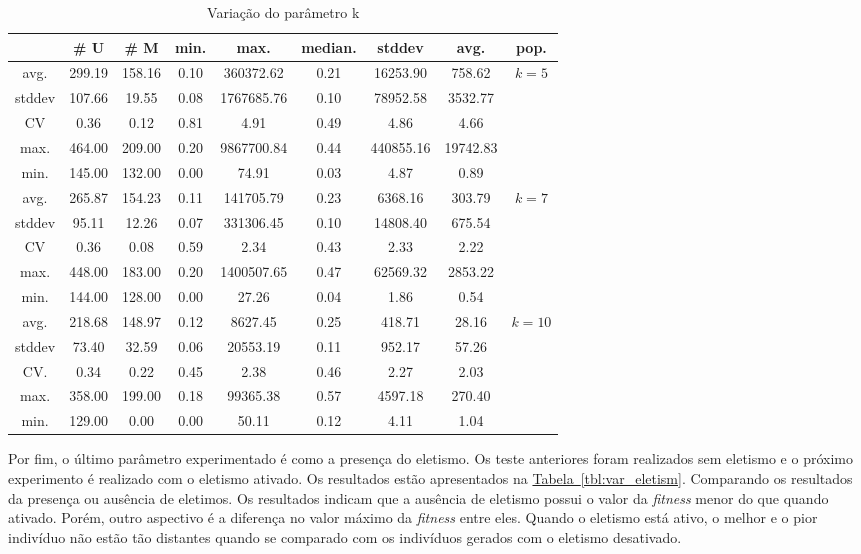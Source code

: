 \documentclass[a4paper]{paper}
\begin{document}
\begin{table}
  \center
  \caption{Variação do parâmetro k}
  \label{tbl:var_k}
  \begin{tabular}{| c | c | c | c | c | c | c | c | c |}
    \hline
    &  \# U & \# M & min. & max. & median. & stddev & avg. & pop. \\ \hline \hline
avg. & 299.19 & 158.16 & 0.10 & 360372.62 & 0.21 & 16253.90 & 758.62 & \multirow{5}{1.5cm}{$k=5$} \\ \cline{1-8}
stddev & 107.66 & 19.55 & 0.08 & 1767685.76 & 0.10 & 78952.58 & 3532.77 & \\ \cline{1-8}
CV & 0.36 & 0.12 & 0.81 & 4.91 & 0.49 & 4.86 & 4.66 & \\ \cline{1-8}
max. & 464.00 & 209.00 & 0.20 & 9867700.84 & 0.44 & 440855.16 & 19742.83 & \\ \cline{1-8}
min. & 145.00 & 132.00 & 0.00 & 74.91 & 0.03 & 4.87 & 0.89 & \\ \hline \hline
avg. & 265.87 & 154.23 & 0.11 & 141705.79 & 0.23 & 6368.16 & 303.79 & \multirow{5}{1.5cm}{$k=7$} \\ \cline{1-8}
stddev & 95.11 & 12.26 & 0.07 & 331306.45 & 0.10 & 14808.40 & 675.54 & \\ \cline{1-8}
CV & 0.36 & 0.08 & 0.59 & 2.34 & 0.43 & 2.33 & 2.22 & \\ \cline{1-8}
max. & 448.00 & 183.00 & 0.20 & 1400507.65 & 0.47 & 62569.32 & 2853.22 & \\ \cline{1-8}
min. & 144.00 & 128.00 & 0.00 & 27.26 & 0.04 & 1.86 & 0.54 & \\ \hline \hline
avg. & 218.68 & 148.97 & 0.12 & 8627.45 & 0.25 & 418.71 & 28.16 & \multirow{5}{1.5cm}{$k=10$}\\ \cline{1-8}
stddev & 73.40 & 32.59 & 0.06 & 20553.19 & 0.11 & 952.17 & 57.26 & \\ \cline{1-8}
CV. & 0.34 & 0.22 & 0.45 & 2.38 & 0.46 & 2.27 & 2.03 & \\ \cline{1-8}
max. & 358.00 & 199.00 & 0.18 & 99365.38 & 0.57 & 4597.18 & 270.40 & \\ \cline{1-8}
min. & 129.00 & 0.00 & 0.00 & 50.11 & 0.12 & 4.11 & 1.04 & \\ \hline 
  \end{tabular}
\end{table}

Por fim, o último parâmetro experimentado é como a presença do eletismo. Os
teste anteriores foram realizados sem eletismo e o próximo experimento é
realizado com o eletismo ativado. Os resultados estão apresentados na
\hyperref[tbl:var_eletism]{Tabela~\ref*{tbl:var_eletism}}. Comparando os resultados
da presença ou ausência de eletimos. Os resultados indicam que a ausência de
eletismo possui o valor da \textit{fitness} menor do que quando ativado. Porém,
outro aspectivo é a diferença no valor máximo da \textit{fitness} entre eles.
Quando o eletismo está ativo, o melhor e o pior indivíduo não estão tão distantes
quando se comparado com os indivíduos gerados com o eletismo desativado.
\end{document}
